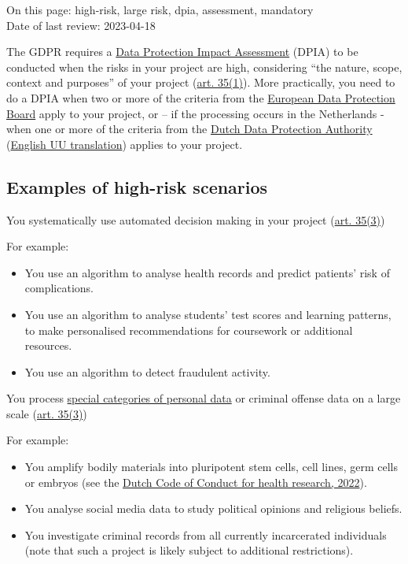 \documentclass[
]{book}
\providecommand{\tightlist}{%
  \setlength{\itemsep}{0pt}\setlength{\parskip}{0pt}}
\begin{document}
On this page: high-risk, large risk, dpia, assessment, mandatory\\
Date of last review: 2023-04-18

The GDPR requires a \protect\hyperlink{dpia}{Data Protection Impact Assessment} (DPIA) to be
conducted when the risks in your project are high, considering ``the nature,
scope, context and purposes'' of your project
(\href{https://gdpr-info.eu/art-35-gdpr/}{art. 35(1)}). More
practically, you need to do a DPIA when two or more of the criteria from the
\href{https://ec.europa.eu/newsroom/article29/items/611236}{European Data Protection Board}
apply to your project, or -- if the processing occurs in the Netherlands - when
one or more of the criteria from the
\href{https://www.autoriteitpersoonsgegevens.nl/sites/default/files/atoms/files/stcrt-2019-64418.pdf}{Dutch Data Protection Authority}
(\href{https://intranet.uu.nl/en/system/files/mandatory_dpias_unofficial_translation_of_ap_decision.pdf}{English UU translation})
applies to your project.

\hypertarget{high-risk-examples}{%
\subsection{Examples of high-risk scenarios}\label{high-risk-examples}}

You systematically use automated decision making in your project
(\href{https://gdpr-info.eu/art-35-gdpr/}{art. 35(3)})

For example:

\begin{itemize}
\tightlist
\item
  You use an algorithm to analyse health records and predict patients' risk of
  complications.
\item
  You use an algorithm to analyse students' test scores and learning patterns,
  to make personalised recommendations for coursework or additional resources.
\item
  You use an algorithm to detect fraudulent activity.
\end{itemize}

You process \protect\hyperlink{special-types-personal-data}{special categories of personal data}
or criminal offense data on a large scale
(\href{https://gdpr-info.eu/art-35-gdpr/}{art. 35(3)})

For example:

\begin{itemize}
\tightlist
\item
  You amplify bodily materials into pluripotent stem cells, cell lines, germ
  cells or embryos (see the
  \href{https://www.coreon.org/wp-content/uploads/2022/01/Gedragscode-Gezondheidsonderzoek-2022.pdf\#page=58}{Dutch Code of Conduct for health research, 2022}).
\item
  You analyse social media data to study political opinions and religious
  beliefs.
\item
  You investigate criminal records from all currently incarcerated individuals
  (note that such a project is likely subject to additional restrictions).
\end{itemize}
\end{document}
